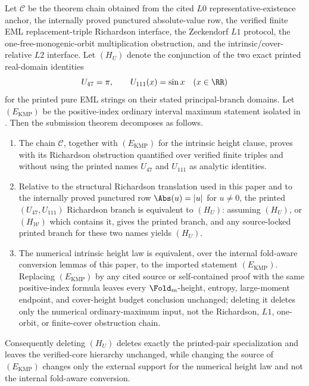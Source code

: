 \begin{theorem}
\label{thm:verified-core-printed-specialization-decomposition}
\label{thm:printed-specialization-biconditional}
\label{thm:optional-source-decomposition}
Let \(\mathcal C\) be the theorem chain obtained from the cited \(L0\)
representative-existence anchor, the internally proved punctured absolute-value
row, the verified finite EML replacement-triple Richardson interface, the
Zeckendorf \(L1\) protocol, the one-free-monogenic-orbit multiplication
obstruction, and the intrinsic/cover-relative \(L2\) interface.  Let
\((H_U)\) denote the conjunction of the two exact printed real-domain identities
\[
  U_{47}=\pi,
  \qquad
  U_{111}(x)=\sin x\quad(x\in\RR)
\]
for the printed pure EML strings on their stated principal-branch domains.  Let
\((E_{\mathrm{KMP}})\) be the positive-index ordinary interval maximum statement
isolated in .  Then the
submission theorem decomposes as follows.
\begin{enumerate}
\item The chain \(\mathcal C\), together with \((E_{\mathrm{KMP}})\) for the
  intrinsic height clause, proves  with its Richardson
  obstruction quantified over verified finite triples and without using the
  printed names \(U_{47}\) and \(U_{111}\) as analytic identities.
\item Relative to the structural Richardson translation used in this paper and to
  the internally proved punctured row \(\Abs(u)=|u|\) for \(u\ne0\), the printed
  \((U_{47},U_{111})\) Richardson branch is equivalent to \((H_U)\): assuming
  \((H_U)\), or \((H_{\mathcal W})\) which contains it, gives the printed branch,
  and any source-locked printed branch for these two names yields \((H_U)\).
\item The numerical intrinsic height law is equivalent, over the internal
  fold-aware conversion lemmas of this paper, to the imported statement
  \((E_{\mathrm{KMP}})\).  Replacing \((E_{\mathrm{KMP}})\) by any cited source or
  self-contained proof with the same positive-index formula leaves every
  \(\Fold_m\)-height, entropy, large-moment endpoint, and cover-height budget
  conclusion unchanged; deleting it deletes only the numerical ordinary-maximum
  input, not the Richardson, \(L1\), one-orbit, or finite-cover obstruction
  chain.
\end{enumerate}
Consequently deleting \((H_U)\) deletes exactly the printed-pair specialization
and leaves the verified-core hierarchy unchanged, while changing the source of
\((E_{\mathrm{KMP}})\) changes only the external support for the numerical height
law and not the internal fold-aware conversion.
\end{theorem}


